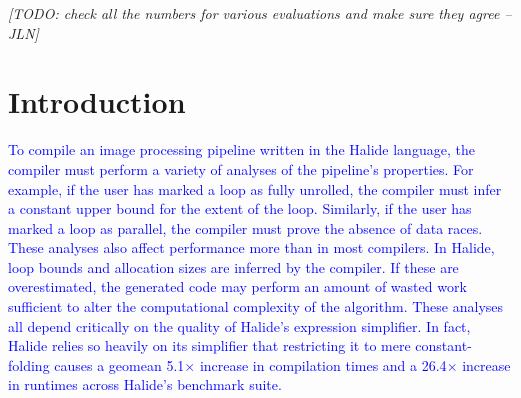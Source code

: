 \documentclass[acmsmall,review]{acmart}\settopmatter{printfolios=true,printccs=false,printacmref=false}
\newcommand{\jln}[1]{\textcolor{uwpurple}{\textit{[{#1} --JLN]}}}
\newcommand{\modified}[1]{\textcolor{red}{{#1}}}
\newcommand{\modifiedagain}[1]{\textcolor{blue}{{#1}}}
\begin{document}




\maketitle


\jln{TODO: check all the numbers for various evaluations and make sure they agree}
\section{Introduction}
\label{sec:introduction}
\modifiedagain{To compile an image processing pipeline written in the
  Halide language, the compiler must perform a variety of analyses of
  the pipeline's properties. For example, if the user has marked a
  loop as fully unrolled, the compiler must infer a constant upper
  bound for the extent of the loop. Similarly, if the user has marked
  a loop as parallel, the compiler must prove the absence of data
  races. These analyses also affect performance more than in most
  compilers. In Halide, loop bounds and allocation sizes are inferred
  by the compiler. If these are overestimated, the generated code may
  perform an amount of wasted work sufficient to alter the
  computational complexity of the algorithm. These analyses all depend
  critically on the quality of Halide's expression simplifier. In
  fact, Halide relies so heavily on its simplifier that restricting it
  to mere constant-folding causes a geomean 5.1$\times$ increase in
  compilation times and a 26.4$\times$ increase in runtimes across
  Halide's benchmark suite.  }

\end{document}
